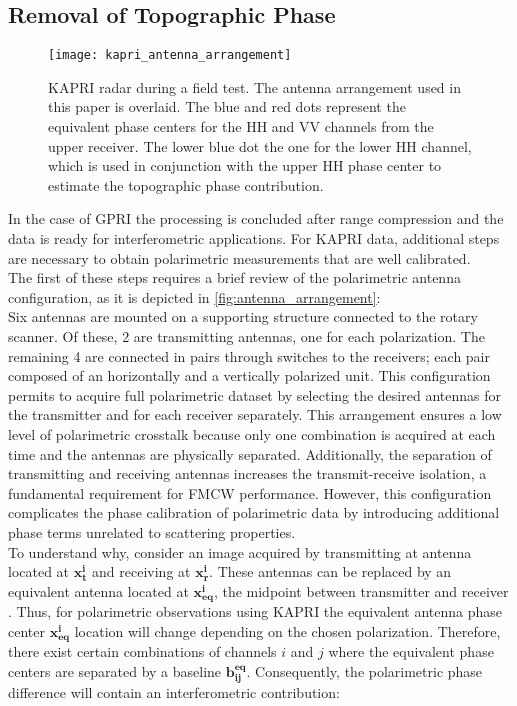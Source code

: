 \subsection{Removal of Topographic Phase}\label{sec:methods:topo_removal}
\begin{figure}[ht]
	\centering
	\texttt{[image: kapri\_antenna\_arrangement]}
	\caption{KAPRI radar during a field test. The antenna arrangement used in this paper is overlaid. The blue and red dots represent the equivalent phase centers for the  HH and VV channels from the upper receiver. The lower blue dot the one for the lower HH channel, which is used in conjunction with the upper HH phase center to estimate the topographic phase contribution.}
	\label{fig:antenna_arrangement}
\end{figure}
In the case of GPRI the processing is concluded after range compression and the data is ready for interferometric applications.  For KAPRI data, additional steps are necessary to obtain polarimetric measurements that are well calibrated.\\ The first of these steps requires a brief review of the polarimetric antenna configuration, as it is depicted in \autoref{fig:antenna_arrangement}:\\ Six antennas are mounted on a supporting structure connected to the rotary scanner. Of these, 2 are transmitting antennas, one for each polarization. The remaining 4 are connected in pairs through switches to the receivers; each pair composed of an horizontally and a vertically polarized unit. This configuration permits to acquire full polarimetric dataset by selecting the desired antennas for the transmitter and for each receiver separately. This arrangement ensures a low level of polarimetric crosstalk because only one combination is acquired at each time and the antennas are physically separated. Additionally, the separation of transmitting and receiving antennas increases the transmit-receive isolation, a fundamental requirement for FMCW performance\cite{Beasley1990,Stove1992, Strozzi2011}.  However, this configuration complicates the phase calibration of polarimetric data by introducing additional phase terms unrelated to scattering properties.\\
To understand why, consider an image acquired by transmitting at antenna located at $\mathbf{x_t^i}$ and receiving at $\mathbf{x_r^i}$. These antennas can be replaced by an equivalent antenna located at $\mathbf{x_{eq}^i}$, the midpoint between transmitter and receiver \cite{Pipia2009}. Thus, for polarimetric observations using  KAPRI the equivalent antenna phase center $\mathbf{x_{eq}^i}$ location will change depending on the chosen polarization. Therefore, there exist certain combinations of channels $i$ and $j$ where the equivalent phase centers are separated by a baseline $\mathbf{b_{ij}^{eq}}$. Consequently, the polarimetric phase difference   will contain an interferometric contribution:
